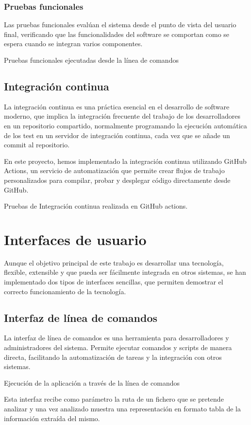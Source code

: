 \subsubsection*{Pruebas funcionales}
Las pruebas funcionales evalúan el sistema desde el punto de vista del usuario final, verificando que las
funcionalidades del software se comportan como se espera cuando se integran varios componentes.


Pruebas funcionales ejecutadas desde la línea de comandos

\subsection*{Integración continua}
La integración continua es una práctica esencial en el desarrollo de software moderno, que implica la integración
frecuente del trabajo de los desarrolladores en un repositorio compartido, normalmente programando la ejecución
automática de los test en un servidor de integración continua, cada vez que se añade un commit al repositorio.

En este proyecto, hemos implementado la integración continua utilizando GitHub Actions, un servicio de automatización
que permite crear flujos de trabajo personalizados para compilar, probar y desplegar código directamente desde GitHub.


Pruebas de Integración continua realizada en GitHub actions.

\section*{Interfaces de usuario}
Aunque el objetivo principal de este trabajo es desarrollar una tecnología, flexible, extensible y que pueda ser
fácilmente integrada en otros sistemas, se han implementado dos tipos de interfaces sencillas, que permiten demostrar el
correcto funcionamiento de la tecnología.

\subsection*{Interfaz de línea de comandos}
La interfaz de línea de comandos es una herramienta para desarrolladores y administradores del sistema. Permite ejecutar
comandos y scripts de manera directa, facilitando la automatización de tareas y la integración con otros sistemas.


Ejecución de la aplicación a través de la línea de comandos

Esta interfaz recibe como parámetro la ruta de un fichero que se pretende analizar y una vez analizado muestra una
representación en formato tabla de la información extraída del mismo.

